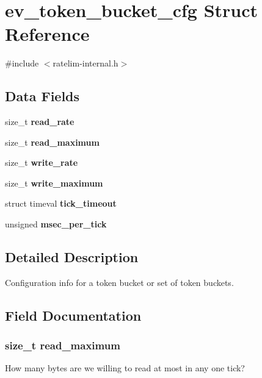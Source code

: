 \section{ev\-\_\-token\-\_\-bucket\-\_\-cfg \-Struct \-Reference}
\label{structev__token__bucket__cfg}


{\ttfamily \#include $<$ratelim-\/internal.\-h$>$}

\subsection*{\-Data \-Fields}
\begin{DoxyCompactItemize}
\item 
size\-\_\-t {\bf read\-\_\-rate}
\item 
size\-\_\-t {\bf read\-\_\-maximum}
\item 
size\-\_\-t {\bf write\-\_\-rate}
\item 
size\-\_\-t {\bf write\-\_\-maximum}
\item 
struct timeval {\bfseries tick\-\_\-timeout}\label{structev__token__bucket__cfg_a0693b06d1004835f88a1e5dce7d73498}

\item 
unsigned {\bfseries msec\-\_\-per\-\_\-tick}\label{structev__token__bucket__cfg_a92bd3c93e7a0c42293f3df54df0dbfaa}

\end{DoxyCompactItemize}


\subsection{\-Detailed \-Description}
\-Configuration info for a token bucket or set of token buckets. 

\subsection{\-Field \-Documentation}
\subsubsection[{read\-\_\-maximum}]{\setlength{\rightskip}{0pt plus 5cm}size\-\_\-t {\bf read\-\_\-maximum}}\label{structev__token__bucket__cfg_a24b8af5172e9068717b781324cd5ed99}
\-How many bytes are we willing to read at most in any one tick? 
